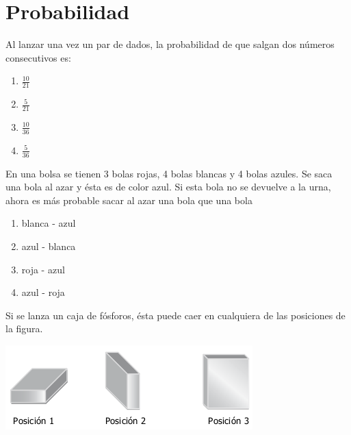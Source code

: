 \documentclass[10pt,twoside]{article}
\begin{document}
\section*{Probabilidad}
\begin{enumerate}
  \item Al lanzar una vez un par de dados, la probabilidad de que salgan dos números consecutivos es:
\begin{multicols}{4}
  \begin{enumerate}
    \item $ \frac{10}{21} $
    \item $ \frac{5}{21} $
    \item $ \frac{10}{36} $
    \item $ \frac{5}{36} $
  \end{enumerate}
\end{multicols}
  \item En una bolsa se tienen 3 bolas rojas, 4 bolas blancas y 4 bolas azules. Se saca una bola al azar y ésta es de color azul. Si esta bola no se devuelve a la urna, ahora es más probable sacar al azar una bola \underline{\hspace{1.5cm}} que una bola \underline{\hspace{1.5cm}}
  \begin{multicols}{2}
\begin{enumerate}
    \item blanca - azul
    \item azul - blanca
    \item roja - azul
    \item azul - roja
    \end{enumerate}
  \end{multicols}
  \begin{minipage}{.4\textwidth}
      \item Si se lanza un caja de fósforos, ésta puede caer en cualquiera de las posiciones de la figura.
  \end{minipage}\hfill
  \begin{minipage}{.55\textwidth}
    \begin{center}
  \includegraphics[scale=.55]{Images/fosforos.png}

\end{center}
\end{minipage}
\end{enumerate}
\end{document}
